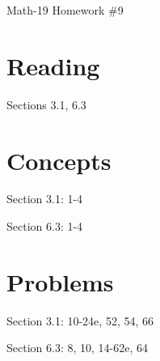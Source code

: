 \documentclass[letterpaper,12pt,fleqn]{article}
\begin{document}
\begin{center}
\Large Math-19 Homework \#9
\end{center}

\section*{Reading}

Sections 3.1, 6.3

\section*{Concepts}

Section 3.1: 1-4

Section 6.3: 1-4

\section*{Problems}

Section 3.1: 10-24e, 52, 54, 66

Section 6.3: 8, 10, 14-62e, 64
\end{document}
